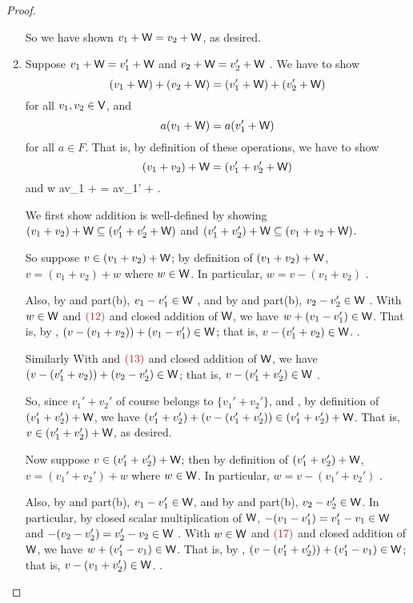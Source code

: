 \begin{proof}
\begin{enumerate}
So we have shown \(v_1 + \textsf{W} = v_2 + \textsf{W}\), as desired.

\item
Suppose \(v_1 + \textsf{W} = v_1' + \textsf{W}\)  and \(v_2 + \textsf{W} = v_2' + \textsf{W}\) .
We have to show
\[
    (v_1 + \textsf{W}) + (v_2 + \textsf{W}) = (v_1' + \textsf{W}) + (v_2' + \textsf{W})
\]
for all \(v_1, v_2 \in \textsf{V}\), and
\[
    a(v_1 + \textsf{W}) = a(v_1' + \textsf{W})
\]
for all \(a \in F\).
That is, by definition of these operations, we have to show
\[
    (v_1 + v_2) + \textsf{W} = (v_1' + v_2' + \textsf{W})
\]
and
\:w
    av_1 + \W = av_1' + \W.
\]

We first show addition is well-defined by showing \((v_1 + v_2) + \textsf{W} \subseteq (v_1' + v_2' + \textsf{W})\) and \((v_1' + v_2') + \textsf{W} \subseteq (v_1 + v_2 + \textsf{W})\).

So suppose \(v \in (v_1 + v_2) + \textsf{W}\);
by definition of \((v_1 + v_2) + \textsf{W}\), \(v = (v_1 + v_2) + w\) where \(w \in \textsf{W}\).
In particular, \(w = v - (v_1 + v_2)\) .

Also, by  and part(b), \(v_1 - v_1' \in \textsf{W}\) , and by  and part(b), \(v_2 - v_2' \in \textsf{W}\) .
With \(w \in \textsf{W}\) and \(\MAROON{(12)}\) and closed addition of \(\textsf{W}\), we have \(w + (v_1 - v_1') \in \textsf{W}\).
That is, by , \((v - (v_1 + v_2)) + (v_1 - v_1') \in \textsf{W}\);
that is, \(v - (v_1' + v_2) \in \textsf{W}\). .

Similarly With  and \(\MAROON{(13)}\) and closed addition of \(\textsf{W}\), we have \((v - (v_1' + v_2)) + (v_2 - v_2') \in \textsf{W}\);
that is, \(v - (v_1' + v_2') \in \textsf{W}\) .

So, since \(v_1' + v_2'\) of course belongs to \(\{ v_1' + v_2' \}\), and , by definition of \((v_1' + v_2') + \textsf{W}\), we have \((v_1' + v_2') + (v - (v_1' + v_2')) \in (v_1' + v_2') + \textsf{W}\).
That is, \(v \in (v_1' + v_2') + \textsf{W}\), as desired.

Now suppose \(v \in (v_1' + v_2') + \textsf{W}\);
then by definition of \((v_1' + v_2') + \textsf{W}\), \(v = (v_1' + v_2') + w\) where \(w \in \textsf{W}\).
In particular, \(w = v - (v_1' + v_2')\) .

Also, by  and part(b), \(v_1 - v_1' \in \textsf{W}\), and by  and part(b), \(v_2 - v_2' \in \textsf{W}\).
In particular, by closed scalar multiplication of \(\textsf{W}\), \(-(v_1 - v_1') = v_1' - v_1 \in \textsf{W}\)  and \(-(v_2 - v_2') = v_2' - v_2 \in \textsf{W}\) .
With \(w \in \textsf{W}\) and \(\MAROON{(17)}\) and closed addition of \(\textsf{W}\), we have \(w + (v_1' - v_1) \in \textsf{W}\).
That is, by , \((v - (v_1' + v_2')) + (v_1' - v_1) \in \textsf{W}\);
that is, \(v - (v_1 + v_2') \in \textsf{W}\). .


\end{enumerate}
\end{proof}
